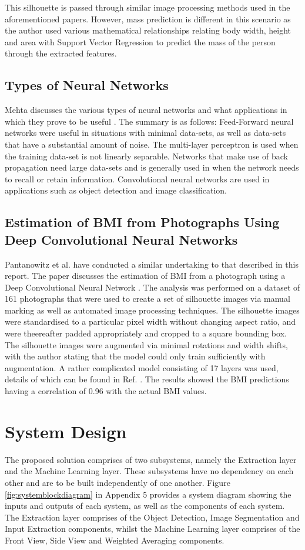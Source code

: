 \documentclass[conference]{IEEEtran}
\begin{document}
This silhouette is passed through similar image processing methods used in the aforementioned papers. 
However, mass prediction is different in this scenario as the author used various mathematical relationships relating body width, height and area with Support Vector Regression to predict the mass of the person through the extracted features.

\subsection{Types of Neural Networks}
Mehta discusses the various types of neural networks and what applications in which they prove to be useful \cite{mehta_2019}. 
The summary is as follows:
Feed-Forward neural networks were useful in situations with minimal data-sets, as well as data-sets that have a substantial amount of noise.
The multi-layer perceptron is used when the training data-set is not linearly separable.
Networks that make use of back propagation need large data-sets and is generally used in when the network needs to recall or retain information.
Convolutional neural networks are used in applications such as object detection and image classification.

\subsection{Estimation of BMI from Photographs Using Deep Convolutional Neural Networks}
Pantanowitz et al. have conducted a similar undertaking to that described in this report.
The paper discusses the estimation of BMI from a photograph using a Deep Convolutional Neural Network \cite{bmifromphoto}.
The analysis was performed on a dataset of 161 photographs that were used to create a set of silhouette images via manual marking as well as automated image processing techniques.
The silhouette images were standardised to a particular pixel width without changing aspect ratio, and were theereafter padded appropriately and cropped to a square bounding box.
The silhouette images were augmented via minimal rotations and width shifts, with the author stating that the model could only train sufficiently with augmentation.
A rather complicated model consisting of 17 layers was used, details of which can be found in Ref. \cite{bmifromphoto}.
The results showed the BMI predictions having a correlation of 0.96 with the actual BMI values.

\section{System Design}
The proposed solution comprises of two subsystems, namely the Extraction layer and the Machine Learning layer.
These subsystems have no dependency on each other and are to be built independently of one another.
Figure \ref{fig:systemblockdiagram} in Appendix 5 provides a system diagram showing the inputs and outputs of each system, as well as the components of each system.
The Extraction layer comprises of the Object Detection, Image Segmentation and Input Extraction components, whilst the Machine Learning layer comprises of the Front View, Side View and Weighted Averaging components.
\end{document}
